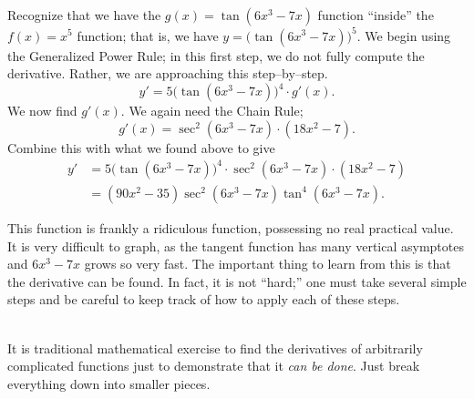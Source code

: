 {Recognize that we have the $g(x)=\tan(6x^3-7x)$ function ``inside'' the $f(x)=x^5$ function; that is, we have $y = \big(\tan(6x^3-7x)\big)^5$. We begin using the Generalized Power Rule; in this first step, we do not fully compute the derivative. Rather, we are approaching this step--by--step.
$$y' = 5\big(\tan(6x^3-7x)\big)^4\cdot g'(x).$$
We now find $g'(x)$. We again need the Chain Rule; $$g'(x) = \sec^2(6x^3-7x)\cdot(18x^2-7).$$ Combine this with what we found above to give
\begin{align*}
y' &= 5\big(\tan(6x^3-7x)\big)^4\cdot\sec^2(6x^3-7x)\cdot(18x^2-7)\\ 
&= (90x^2-35)\sec^2(6x^3-7x)\tan^4(6x^3-7x).
\end{align*}

This function is frankly a ridiculous function, possessing no real practical value. It is very difficult to graph, as the tangent function has many vertical asymptotes and $6x^3-7x$ grows so very fast. The important thing to learn from this is that the derivative can be found. In fact, it is not ``hard;'' one must take several simple steps and be careful to keep track of how to apply each of these steps.%
}\\

It is traditional mathematical exercise to find the derivatives of arbitrarily complicated functions just to demonstrate that it \textit{can be done}. Just break everything down into smaller pieces. \\


